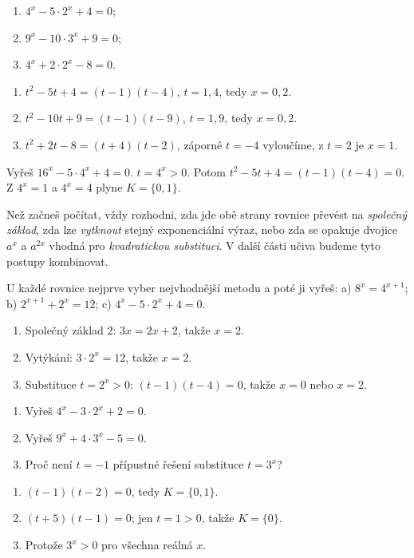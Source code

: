 \documentclass[11pt,a4paper]{article}
\begin{document}
\begin{zadaniReseniBox}[title={Samostatná práce 1}]
\begin{enumerate}[label=\alph*)]
\item $4^x-5\cdot2^x+4=0$;
\item $9^x-10\cdot3^x+9=0$;
\item $4^x+2\cdot2^x-8=0$.
\end{enumerate}
\tcblower
\begin{enumerate}[label=\alph*)]
\item $t^2-5t+4=(t-1)(t-4)$, $t=1,4$, tedy $x=0,2$.
\item $t^2-10t+9=(t-1)(t-9)$, $t=1,9$, tedy $x=0,2$.
\item $t^2+2t-8=(t+4)(t-2)$, záporné $t=-4$ vyloučíme, z $t=2$ je $x=1$.
\end{enumerate}
\end{zadaniReseniBox}
\begin{zadaniReseniBox}[title={Rozšíření 1}]
Vyřeš $16^x-5\cdot4^x+4=0$.
\tcblower
$t=4^x>0$. Potom $t^2-5t+4=(t-1)(t-4)=0$. Z $4^x=1$ a $4^x=4$ plyne $K=\{0,1\}$.
\end{zadaniReseniBox}
Než začneš počítat, vždy rozhodni, zda jde obě strany rovnice převést na \emph{společný základ}, zda lze \emph{vytknout} stejný exponenciální výraz, nebo zda se opakuje dvojice $a^x$ a $a^{2x}$ vhodná pro \emph{kvadratickou substituci}. V další části učiva budeme tyto postupy kombinovat.
\begin{zadaniReseniBox}[title={Samostatná práce 2}]
U každé rovnice nejprve vyber nejvhodnější metodu a poté ji vyřeš: a) $8^x=4^{x+1}$; b) $2^{x+1}+2^x=12$; c) $4^x-5\cdot2^x+4=0$.
\tcblower
\begin{enumerate}[label=\alph*)]
\item Společný základ $2$: $3x=2x+2$, takže $x=2$.
\item Vytýkání: $3\cdot2^x=12$, takže $x=2$.
\item Substituce $t=2^x>0$: $(t-1)(t-4)=0$, takže $x=0$ nebo $x=2$.
\end{enumerate}
\end{zadaniReseniBox}
\begin{zadaniReseniBox}[title={Domácí úkol}]
\begin{enumerate}[label=\alph*)]
\item Vyřeš $4^x-3\cdot2^x+2=0$.
\item Vyřeš $9^x+4\cdot3^x-5=0$.
\item Proč není $t=-1$ přípustné řešení substituce $t=3^x$?
\end{enumerate}
\tcblower
\begin{enumerate}[label=\alph*)]
\item $(t-1)(t-2)=0$, tedy $K=\{0,1\}$.
\item $(t+5)(t-1)=0$; jen $t=1>0$, takže $K=\{0\}$.
\item Protože $3^x>0$ pro všechna reálná $x$.
\end{enumerate}
\end{zadaniReseniBox}
\end{document}
